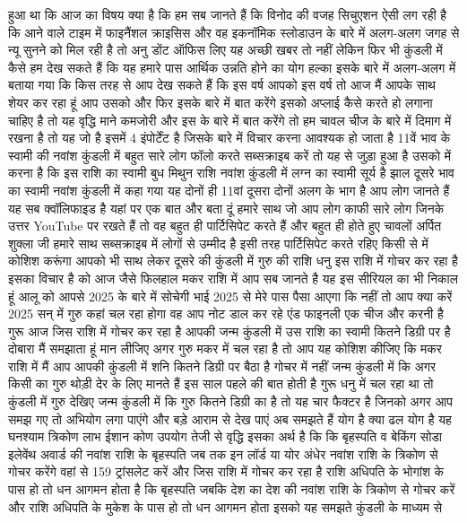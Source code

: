 
हुआ था कि आज का विषय क्या है कि हम सब जानते हैं कि विनोद की वजह सिचुएशन ऐसी लग
रही है कि आने वाले टाइम में फाइनैंशल क्राइसिस और वह इकनॉमिक स्लोडाउन के बारे में अलग-अलग जगह से न्यू सुनने को मिल रही
है तो अनु डोंट ऑफिस लिए यह अच्छी खबर तो नहीं लेकिन फिर भी कुंडली में कैसे हम देख
सकते हैं कि यह हमारे पास आर्थिक उन्नति होने का योग हल्का इसके बारे में अलग-अलग
में बताया गया कि किस तरह से आप देख सकते हैं कि इस वर्ष आपको इस वर्ष तो आज मैं
आपके साथ शेयर कर रहा हूं आप उसको और फिर इसके बारे में बात करेंगे इसको अप्लाई
कैसे करते हो लगाना चाहिए है तो यह वृद्धि माने कमजोरी और इस के
बारे में बात करेंगे तो हम चावल चीज के बारे में दिमाग में रखना है तो यह जो है इसमें 4 इंपोर्टेंट है जिसके बारे में
विचार करना आवश्यक हो जाता है 11वें भाव के स्वामी की नवांश कुंडली में बहुत सारे
लोग फॉलो करते सब्सक्राइब करें तो यह से
जुड़ा हुआ है उसको में करना है कि इस राशि
का स्वामी बुध मिथुन राशि नवांश कुंडली
में लग्न का स्वामी सूर्य है
झाल दूसरे भाव का स्वामी नवांश कुंडली में कहा गया यह दोनों ही 11वां दूसरा दोनों अलग के भाग है आप लोग जानते हैं यह सब
क्वॉलिफाइड है यहां पर एक बात और बता दूं हमारे साथ जो आप लोग काफी सारे लोग जिनके
उत्तर YouTube पर रखते हैं तो वह बहुत ही पार्टिसिपेट करते हैं और बहुत ही होते हुए
चावलों अर्पित शुक्ला जी हमारे साथ सब्सक्राइब में लोगों से उम्मीद है इसी
तरह पार्टिसिपेट करते रहिए किसी से में कोशिश करूंगा आपको भी साथ लेकर दूसरे की
कुंडली में गुरु की राशि धनु इस राशि में
गोचर कर रहा है इसका विचार है को आज जैसे फिलहाल मकर राशि में आप सब जानते है यह इस सीरियल का भी निकाल हूं
आलू को आपसे 2025 के बारे में सोचेगी भाई 2025 से मेरे पास पैसा आएगा कि नहीं तो आप क्या करें 2025 सन् में गुरु कहां चल रहा
होगा वह आप नोट डाल कर रहे एंड फाइनली एक चीज और करनी है गुरू आज जिस राशि में गोचर
कर रहा है आपकी जन्म कुंडली में उस राशि का स्वामी कितने डिग्री पर है दोबारा मैं
समझाता हूं मान लीजिए अगर गुरु मकर में चल रहा है तो आप यह कोशिश कीजिए कि मकर राशि में मैं आप आपकी कुंडली में शनि कितने
डिग्री पर बैठा है गोचर में नहीं जन्म कुंडली में कि अगर किसी का गुरु थोड़ी देर के लिए मानते हैं इस साल पहले की बात होती है
गुरू धनु में चल रहा था तो कुंडली में गुरु देखिए जन्म कुंडली में कि गुरु कितने डिग्री का है तो यह चार फैक्टर है जिनको
अगर आप समझ गए तो अभियोग लगा पाएंगे और बड़े आराम से देख पाएं अब समझते हैं योग
है क्या ढल योग है यह घनश्याम त्रिकोण लाभ
ईशान कोण उपयोग तेजी से वृद्धि इसका अर्थ
है कि कि बृहस्पति व बेकिंग सोडा इलेवेंथ अवार्ड
की नवांश राशि के बृहस्पति जब तक इन लॉर्ड या योर अंधेर नवांश राशि के त्रिकोण से
गोचर करेंगे वहां से 159 ट्रांसलेट करें और जिस राशि में गोचर कर रहा है राशि
अधिपति के भोगांश के पास हो तो धन आगमन होता है कि बृहस्पति जबकि देश का देश की नवांश
राशि के त्रिकोण से गोचर करें और राशि अधिपति के मुकेश के पास हो तो धन आगमन होता इसको यह समझते कुंडली के माध्यम से
